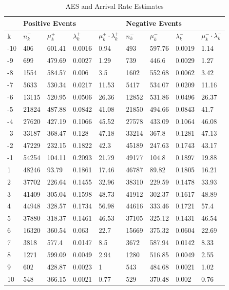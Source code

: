 \begin{table}[htbp]
\caption{AES and Arrival Rate Estimates} \label{tab:parameters}
\begin{center}
\begin{tabular}{l|llll|llll}
\hline \hline
 & \multicolumn{4}{l|}{\textbf{Positive Events}} & \multicolumn{4}{l}{\textbf{Negative Events}} \\
\hline
k   & $n_k^+$ & $\mu^+_k$ & $\lambda^+_k$ & $\mu^+_k \cdot \lambda^+_k$ & $n_k^-$  & $\mu^-_k$  & $\lambda^-_k$ & $\mu^-_k \cdot \lambda^-_k$  \\
\hline
-10 & 406   & 601.41 & 0.0016 & 0.94      & 493   & 597.76 & 0.0019 & 1.14       \\
-9  & 699   & 479.69 & 0.0027 & 1.29      & 739   & 446.6  & 0.0029 & 1.27       \\
-8  & 1554  & 584.57 & 0.006  & 3.5       & 1602  & 552.68 & 0.0062 & 3.42       \\
-7  & 5633  & 530.34 & 0.0217 & 11.53     & 5417  & 534.07 & 0.0209 & 11.16      \\
-6  & 13115 & 520.95 & 0.0506 & 26.36     & 12852 & 531.86 & 0.0496 & 26.37      \\
-5  & 21824 & 487.88 & 0.0842 & 41.08     & 21850 & 494.66 & 0.0843 & 41.7       \\
-4  & 27620 & 427.19 & 0.1066 & 45.52     & 27578 & 433.09 & 0.1064 & 46.08      \\
-3  & 33187 & 368.47 & 0.128  & 47.18     & 33214 & 367.8  & 0.1281 & 47.13      \\
-2  & 47229 & 232.15 & 0.1822 & 42.3      & 45189 & 247.63 & 0.1743 & 43.17      \\
-1  & 54254 & 104.11 & 0.2093 & 21.79     & 49177 & 104.8  & 0.1897 & 19.88      \\
1   & 48246 & 93.79  & 0.1861 & 17.46     & 46787 & 89.82  & 0.1805 & 16.21      \\
2   & 37702 & 226.64 & 0.1455 & 32.96     & 38310 & 229.59 & 0.1478 & 33.93      \\
3   & 41409 & 305.04 & 0.1598 & 48.73     & 41912 & 302.37 & 0.1617 & 48.89      \\
4   & 44948 & 328.57 & 0.1734 & 56.98     & 44616 & 333.46 & 0.1721 & 57.4       \\
5   & 37880 & 318.37 & 0.1461 & 46.53     & 37105 & 325.12 & 0.1431 & 46.54      \\
6   & 16320 & 360.54 & 0.063  & 22.7      & 15669 & 375.32 & 0.0604 & 22.69      \\
7   & 3818  & 577.4  & 0.0147 & 8.5       & 3672  & 587.94 & 0.0142 & 8.33       \\
8   & 1271  & 599.09 & 0.0049 & 2.94      & 1280  & 516.85 & 0.0049 & 2.55       \\
9   & 602   & 428.87 & 0.0023 & 1         & 543   & 484.68 & 0.0021 & 1.02       \\
10  & 548   & 366.15 & 0.0021 & 0.77      & 529   & 370.48 & 0.002  & 0.76      
\end{tabular}
\end{center}
\end{table}

